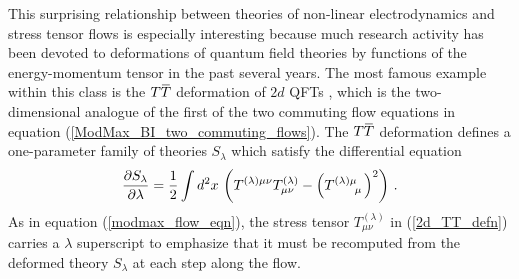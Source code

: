 \documentclass[12pt]{article}
\numberwithin{equation}{section}
\newcommand{\overbar}[1]{\mkern 1.5mu\overline{\mkern-1.5mu#1\mkern-1.5mu}\mkern 1.5mu}
\def\TT{{T\overbar{T}}}
\begin{document}
This surprising relationship between theories of non-linear electrodynamics and stress tensor flows is especially interesting because much research activity has been devoted to deformations of quantum field theories by functions of the energy-momentum tensor in the past several years. The most famous example within this class is the $\TT$ deformation of $2d$ QFTs \cite{Zamolodchikov:2004ce,Smirnov:2016lqw,Cavaglia:2016oda}, which is the two-dimensional analogue of the first of the two commuting flow equations in equation (\ref{ModMax_BI_two_commuting_flows}). The $\TT$ deformation defines a one-parameter family of theories $S_\lambda$ which satisfy the differential equation
%
\begin{align}\label{2d_TT_defn}
    \frac{\partial S_\lambda}{\partial \lambda} = \frac{1}{2} \int d^2 x \, \left( T^{(\lambda) \mu \nu} T^{(\lambda)}_{\mu \nu} - \left( \tensor{T}{^{(\lambda)}^\mu_\mu} \right)^2 \right) \, .
\end{align}
%
As in equation (\ref{modmax_flow_eqn}), the stress tensor $T_{\mu \nu}^{(\lambda)}$ in (\ref{2d_TT_defn}) carries a $\lambda$ superscript to emphasize that it must be recomputed from the deformed theory $S_\lambda$ at each step along the flow. 
\end{document}
